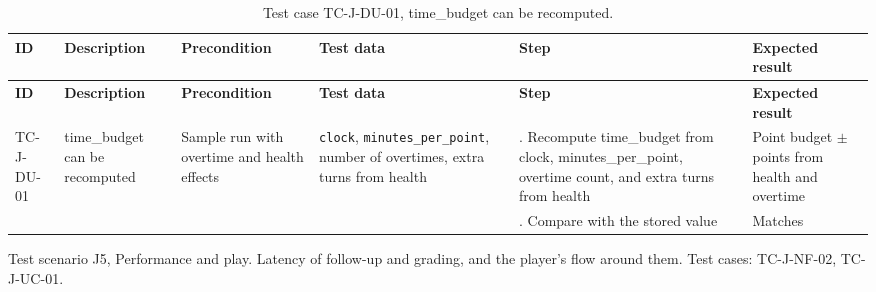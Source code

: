 {\footnotesize{}\renewcommand{\arraystretch}{1.1}
\begin{longtable}{|>{\raggedright\arraybackslash}p{}|>{\raggedright\arraybackslash}p{}|>{\raggedright\arraybackslash}p{}|>{\raggedright\arraybackslash}p{}|>{\raggedright\arraybackslash}p{}|>{\raggedright\arraybackslash}p{}|}
\caption{Test case TC-J-DU-01, time\_budget can be recomputed.} \\
\hline
\textbf{ID} & \textbf{Description} & \textbf{Precondition} & \textbf{Test data} & \textbf{Step} & \textbf{Expected result} \\ \hline
\endfirsthead
\hline
\textbf{ID} & \textbf{Description} & \textbf{Precondition} & \textbf{Test data} & \textbf{Step} & \textbf{Expected result} \\ \hline
\endhead
TC-J-DU-01 & time\_budget can be recomputed & Sample run with overtime and health effects & \texttt{clock}, \texttt{minutes\_\allowbreak{}per\_\allowbreak{}point}, number of overtimes, extra turns from health & 1. Recompute time\_budget from clock, minutes\_\allowbreak{}per\_\allowbreak{}point, overtime count, and extra turns from health & Point budget $\pm$ points from health and overtime \\ \cline{5-6}
 &  &  &  & 2. Compare with the stored value & Matches \\ \hline
\end{longtable}
}

Test scenario J5, Performance and play. Latency of follow-up and grading, and the player's flow around them. Test cases: TC-J-NF-02, TC-J-UC-01.

